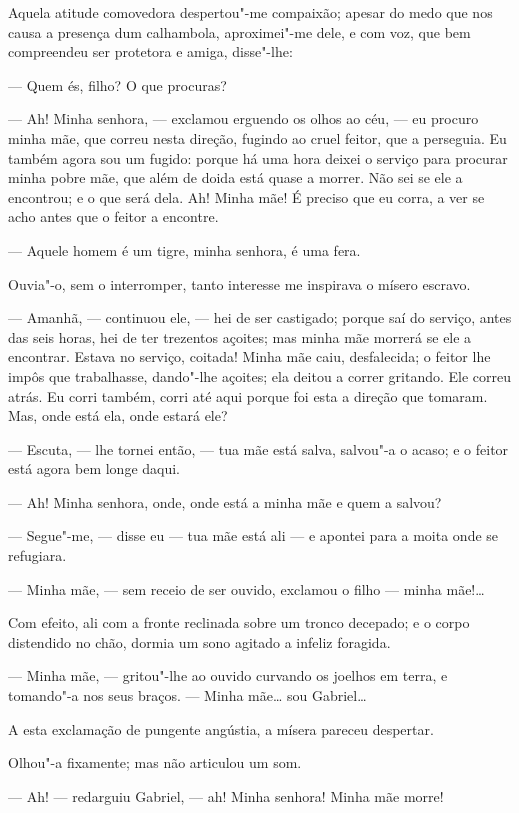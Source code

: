 Aquela atitude comovedora despertou"-me compaixão; apesar do medo que nos
causa a presença dum calhambola, aproximei"-me dele, e com voz, que bem
compreendeu ser protetora e amiga, disse"-lhe:

--- Quem és, filho? O que procuras?

--- Ah! Minha senhora, --- exclamou erguendo os olhos ao céu, --- eu
procuro minha mãe, que correu nesta direção, fugindo ao cruel feitor,
que a perseguia. Eu também agora sou um fugido: porque há uma hora
deixei o serviço para procurar minha pobre mãe, que além de doida está
quase a morrer. Não sei se ele a encontrou; e o que será dela. Ah! Minha
mãe! É preciso que eu corra, a ver se acho antes que o feitor a
encontre.

--- Aquele homem é um tigre, minha senhora, é uma fera.

Ouvia"-o, sem o interromper, tanto interesse me inspirava o mísero
escravo.

--- Amanhã, --- continuou ele, --- hei de ser castigado; porque saí do
serviço, antes das seis horas, hei de ter trezentos açoites; mas minha
mãe morrerá se ele a encontrar. Estava no serviço, coitada! Minha mãe
caiu, desfalecida; o feitor lhe impôs que trabalhasse, dando"-lhe
açoites; ela deitou a correr gritando. Ele correu atrás. Eu corri
também, corri até aqui porque foi esta a direção que tomaram. Mas, onde
está ela, onde estará ele?

--- Escuta, --- lhe tornei então, --- tua mãe está salva, salvou"-a o
acaso; e o feitor está agora bem longe daqui.

--- Ah! Minha senhora, onde, onde está a minha mãe e quem a salvou?

--- Segue"-me, --- disse eu --- tua mãe está ali --- e apontei para a moita
onde se refugiara.

--- Minha mãe, --- sem receio de ser ouvido, exclamou o filho --- minha
mãe!\ldots{}

Com efeito, ali com a fronte reclinada sobre um tronco decepado; e o
corpo distendido no chão, dormia um sono agitado a infeliz foragida.

--- Minha mãe, --- gritou"-lhe ao ouvido curvando os joelhos em terra, e
tomando"-a nos seus braços. --- Minha mãe\ldots{} sou Gabriel\ldots{}

A esta exclamação de pungente angústia, a mísera pareceu despertar.

Olhou"-a fixamente; mas não articulou um som.

--- Ah! --- redarguiu Gabriel, --- ah! Minha senhora! Minha mãe morre!

